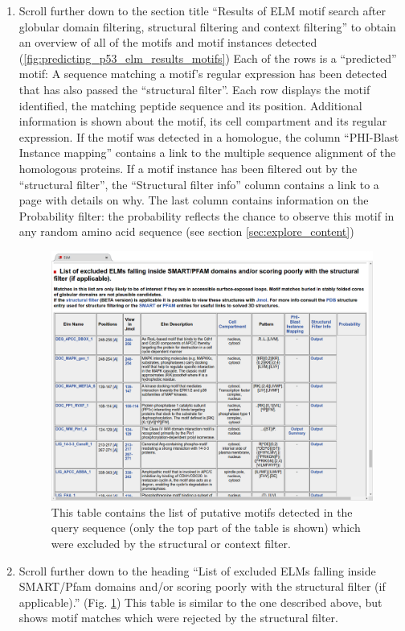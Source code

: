 \documentclass[12pt]{article}
\begin{document}
\begin{enumerate}
\item Scroll further down to the section title ``Results of ELM motif search
	after globular domain filtering, structural filtering and context
	filtering'' to obtain an overview of all of the motifs and motif
	instances detected
	(\ref{fig:predicting_p53_elm_results_motifs})
	Each of the rows is a ``predicted'' motif: A sequence matching a
	motif's regular expression has been detected that has also passed the
	``structural filter''.
	Each row displays the motif identified, the matching peptide
	sequence and its position. Additional information is shown about the
	motif, its cell compartment and its regular expression. If the motif
	was detected in a homologue, the column ``PHI-Blast Instance
	mapping'' contains a link to the multiple sequence alignment of the
	homologous proteins. If a motif instance has been filtered out
	by the ``structural filter'', the ``Structural filter info'' column
	contains a link to a page with details on why.
	The last column contains information on the Probability filter: the
	probability reflects the chance to observe this motif in any random
	amino acid sequence (see section \ref{sec:explore_content})

\begin{figure}[h!]
\centering
	\includegraphics[width=\textwidth]{Figures/predicting_p53/elm_results_motifs_filtered.png}
	\caption{
	This table contains the list of putative motifs detected in the query sequence (only
	the top part of the table is shown) which were excluded by the
	structural or context filter.
	}
	\label{fig:predicting_p53_elm_results_motifs_filtered}
\end{figure}

\item Scroll further down to the heading ``List of excluded ELMs falling inside
	SMART/Pfam domains and/or scoring poorly with the structural filter (if
	applicable).''
	(Fig.  \ref{fig:predicting_p53_elm_results_motifs_filtered})
	This table is similar to the one described above, but shows motif
	matches which were rejected by the structural filter.
	
\end{enumerate}
\end{document}
